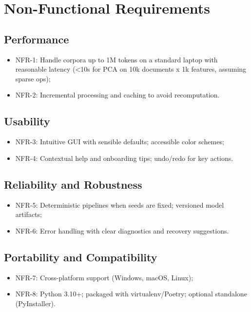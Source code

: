 \section{Non-Functional Requirements}
\subsection{Performance}
\begin{itemize}
    \item NFR-1: Handle corpora up to 1M tokens on a standard laptop with reasonable latency (\textless 10s for PCA on 10k documents x 1k features, assuming sparse ops);
    \item NFR-2: Incremental processing and caching to avoid recomputation.
\end{itemize}

\subsection{Usability}
\begin{itemize}
    \item NFR-3: Intuitive GUI with sensible defaults; accessible color schemes;
    \item NFR-4: Contextual help and onboarding tips; undo/redo for key actions.
\end{itemize}

\subsection{Reliability and Robustness}
\begin{itemize}
    \item NFR-5: Deterministic pipelines when seeds are fixed; versioned model artifacts;
    \item NFR-6: Error handling with clear diagnostics and recovery suggestions.
\end{itemize}

\subsection{Portability and Compatibility}
\begin{itemize}
    \item NFR-7: Cross-platform support (Windows, macOS, Linux);
    \item NFR-8: Python 3.10+; packaged with virtualenv/Poetry; optional standalone (PyInstaller).
\end{itemize}

